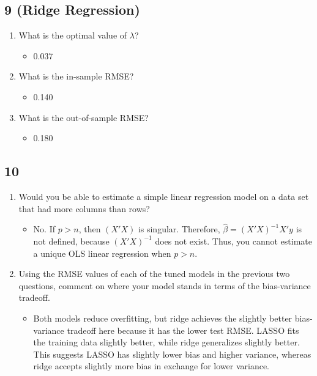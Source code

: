 \documentclass[12pt]{article}
\begin{document}
\subsection*{9 (Ridge Regression)}

\begin{enumerate}
    \item What is the optimal value of $\lambda$?
        \begin{itemize}
            \item[--]  0.037
        \end{itemize}
        
    \item What is the in-sample RMSE?
        \begin{itemize}
            \item[--]  0.140
        \end{itemize}

    \item What is the out-of-sample RMSE?
        \begin{itemize}
            \item[--]  0.180
        \end{itemize}
\end{enumerate}


\subsection*{10}

\begin{enumerate}
    \item Would you be able to estimate a simple linear regression model on a data set that had more columns than rows? 
        \begin{itemize}
            \item[--] No. If $p>n$, then $(X'X)$ is singular. Therefore, $\hat{\beta} = (X'X)^{-1}X'y$ is not defined, because $(X'X)^{-1}$ does not exist. Thus, you cannot estimate a unique OLS linear regression when $p>n$.
        \end{itemize}

    \item Using the RMSE values of each of the tuned models in the previous two questions, comment on where your model stands in terms of the bias-variance tradeoff.
        \begin{itemize}
            \item[--] Both models reduce overfitting, but ridge achieves the slightly better bias-variance tradeoff here because it has the lower test RMSE. LASSO fits the training data slightly better, while ridge generalizes slightly better. This suggests LASSO has slightly lower bias and higher variance, whereas ridge accepts slightly more bias in exchange for lower variance.
        \end{itemize}
\end{enumerate}



\end{document}
